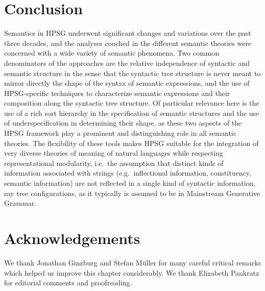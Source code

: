 \documentclass[output=paper
	        ,collection
	        ,collectionchapter
 	        ,biblatex
                ,babelshorthands
                ,newtxmath
                ,draftmode
                ,colorlinks, citecolor=brown
]{langscibook}
\begin{document}
\section{Conclusion}

Semantics in HPSG underwent significant changes and variations over the past three decades, and the analyses couched in the different semantic theories were concerned with a wide variety of semantic phenomena. Two common denominators of the approaches are the relative independence of syntactic and
 semantic structure in the sense that the syntactic tree structure is never meant to mirror directly the shape of the syntax of semantic expressions, and the use of HPSG-specific techniques to characterize semantic expressions and their composition along the syntactic tree structure. Of particular relevance here is the use of a rich sort hierarchy in the specification of semantic structures and the use of underspecification in determining their shape, as these two aspects of the HPSG framework play a prominent and distinguishing role in all semantic theories. The flexibility of these tools makes HPSG suitable for the integration of very diverse theories of meaning of natural languages while respecting representational modularity, i.e.\ the 
assumption that 
 distinct kinds of information associated with strings (e.g.\ inflectional information, constituency, semantic information) are not reflected in a single kind of syntactic information, say tree configurations, as it typically is assumed to be in Mainstream Generative Grammar.


\section*{Acknowledgements}

We thank Jonathan Ginzburg and Stefan M\"uller for many careful critical remarks which helped
us improve this chapter considerably. We thank
Elizabeth Pankratz for editorial comments and proofreading.


{\sloppy
\printbibliography[heading=subbibliography,notkeyword=this] 
}
\end{document}
